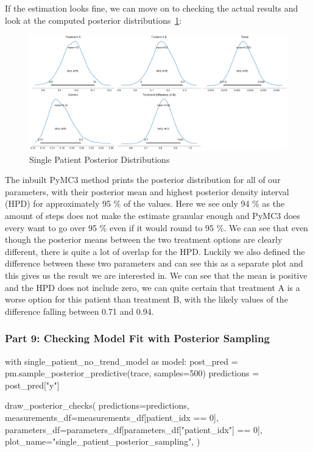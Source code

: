 \documentclass[12pt,a4paper,leqno]{report}
\theoremstyle{plain}
\theoremstyle{definition}
\theoremstyle{remark}
\begin{document}
If the estimation looks fine, we can move on to checking the actual results and look at
the computed posterior distributions\ \ref{singlepatientposteriors}:

\bigskip
\begin{figure}[H]
    \caption{Single Patient Posterior Distributions}\label{singlepatientposteriors}
    \bigskip
    \includegraphics[width=\textwidth,height=\textheight,keepaspectratio]{single_patient_posteriors.pdf}
\end{figure}
\bigskip

The inbuilt PyMC3 method prints the posterior distribution for all of our parameters,
with their posterior mean and highest posterior density interval (HPD) for approximately
95 \% of the values. Here we see only 94 \% as the amount of steps does not make the
estimate granular enough and PyMC3 does every want to go over 95 \% even if it would
round to 95 \%. We can see that even though the posterior means between
the two treatment options are clearly different, there is quite a lot of overlap for the
HPD. Luckily we also defined the difference between these two parameters and can see
this as a separate plot and this gives us the result we are interested in. We can see
that the mean is positive and the HPD does not include zero, we can quite certain that
treatment A is a worse option for this patient than treatment B, with the likely values of
the difference falling between 0.71 and 0.94.


\subsubsection*{Part 9: Checking Model Fit with Posterior Sampling}

\bigskip
\begin{pyverbatim}[][fontsize=\footnotesize]
    with single_patient_no_trend_model as model:
        post_pred = pm.sample_posterior_predictive(trace, samples=500)
        predictions = post_pred["y"]

    draw_posterior_checks(
        predictions=predictions,
        measurements_df=measurements_df[patient_idx == 0],
        parameters_df=parameters_df[parameters_df["patient_idx"] == 0],
        plot_name="single_patient_posterior_sampling",
    )
\end{pyverbatim}
\smallskip
\end{document}
